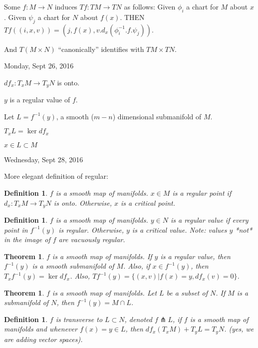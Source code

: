 \documentclass[11pt,leqno,oneside]{amsart}
\theoremstyle{mystyle} \newtheorem{thrm}[thm]{Theorem}
\theoremstyle{mystyle} \newtheorem{defi}[thm]{Definition}
\begin{document}
Some $f: M \to N$ induces $Tf : TM \to TN$ as follows:
Given $\phi_i$ a chart for $M$ about $x$.
Given $\psi_j$ a chart for $N$ about $f(x)$.
THEN
$Tf((i, x, v)) = (j, f(x), v.d_x(\phi_i^{-1}.f.\psi_j))$.

And $T(M \times N)$ ``canonically'' identifies with $TM \times TN$.


Monday, Sept 26, 2016



$df_x : T_xM \to T_yN$ is onto.

$y$ is a regular value of $f$.

Let $L = f^{-1}(y)$, a smooth ($m-n$) dimensional submanifold of $M$.

$T_xL = \ker df_x$

$x \in L \subset M$


Wednesday, Sept 28, 2016

More elegant definition of regular:
\begin{defi}
	$f$ is a smooth map of manifolds.
	$x \in M$ is a \emph{regular} point if $d_x : T_xM \to T_yN$ is onto.  Otherwise, $x$ is a \emph{critical} point.
\end{defi}

\begin{defi}
	$f$ is a smooth map of manifolds.
	$y \in N$ is a \emph{regular} value if every point in $f^{-1}(y)$ is regular.  Otherwise, $y$ is a \emph{critical} value.  Note: values $y$ *not* in the image of $f$ are vacuously regular.
\end{defi}

\begin{thrm}
	$f$ is a smooth map of manifolds.
	If $y$ is a regular value, then $f^{-1}(y)$ is a smooth submanifold of $M$.
	Also, if $x \in f^{-1}(y)$, then $T_xf^{-1}(y) = \ker df_x$.
	Also, $Tf^{-1}(y) = \{ (x,v) | f(x)=y, df_x(v) = 0\}$.
\end{thrm}

\begin{thrm}
	$f$ is a smooth map of manifolds.
	Let $L$ be a subset of $N$.
	If $M$ is a submanifold of $N$, then $f^{-1}(y) = M \cap L$.
\end{thrm}

\begin{defi}
	$f$ is \emph{transverse} to $L \subset N$, denoted $f \pitchfork L$, if $f$ is a smooth map of manifolds and whenever $f(x) = y \in L$, then $df_x(T_xM) + T_yL = T_yN$.  (yes, we are adding vector spaces).
\end{defi}
\end{document}
